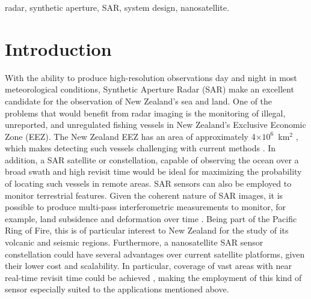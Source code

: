 \documentclass[conference,a4paper]{IEEEtran}
\begin{document}
    \baselineskip
    \begin{IEEEkeywords}
        radar, synthetic aperture, SAR, system design, nanosatellite.
    \end{IEEEkeywords}


%


    \section{Introduction}
    \label{sec:intro}
    With the ability to produce high-resolution observations day and night in most meteorological conditions, Synthetic Aperture Radar (SAR) \cite{moreira_tutorial} make an excellent candidate for the observation of New Zealand's sea and land.
    One of the problems that would benefit from radar imaging is the monitoring of illegal, unreported, and unregulated fishing vessels in New Zealand's Exclusive Economic Zone (EEZ).
    The New Zealand EEZ has an area of approximately 4$\times 10^6$~km$^2$ \cite{NZEEZ}, which makes detecting such vessels challenging with current methods \cite{JAN}.
    In addition, a SAR satellite or constellation, capable of observing the ocean over a broad swath and high revisit time would be ideal for maximizing the probability of locating such vessels in remote areas.
    SAR sensors can also be employed to monitor terrestrial features.
    Given the coherent nature of SAR images, it is possible to produce multi-pass interferometric measurements to monitor, for example, land subsidence and deformation over time \cite{Interferometry}.
    Being part of the Pacific Ring of Fire, this is of particular interest to New Zealand for the study of its volcanic and seismic regions.
    Furthermore, a nanosatellite SAR sensor constellation could have several advantages over current satellite platforms, given their lower cost and scalability.
    In particular, coverage of vast areas with near real-time revisit time could be achieved \cite{ReviewCubeSats}, making the employment of this kind of sensor especially suited to the applications mentioned above.\\
\end{document}
